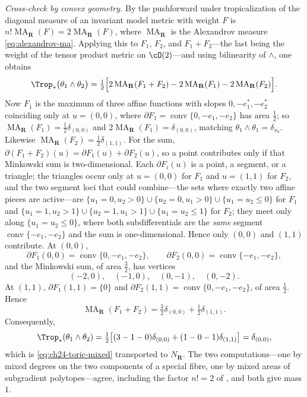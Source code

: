 \begin{example}
\emph{Cross-check by convex geometry.}  By
 the pushforward under tropicalization of the
diagonal measure of an invariant model metric with weight \(F\) is
\(n!\operatorname{MA}_{\mathbf R}(F)=2\operatorname{MA}_{\mathbf R}(F)\),
where \(\operatorname{MA}_{\mathbf R}\) is the Alexandrov measure
\eqref{eq:alexandrov-ma}.  Applying this to \(F_1\), \(F_2\), and
\(F_1+F_2\)---the last being the weight of the tensor product metric on
\(\cO(2)\)---and using bilinearity of \(\wedge\), one obtains
\[
 \Trop_*\bigl(\theta_1\wedge\theta_2\bigr)
 =\tfrac12\Bigl[
   2\operatorname{MA}_{\mathbf R}(F_1+F_2)
   -2\operatorname{MA}_{\mathbf R}(F_1)
   -2\operatorname{MA}_{\mathbf R}(F_2)\Bigr].
\]
Now \(F_1\) is the maximum of three affine functions with slopes
\(0,-e_1^*,-e_2^*\) coinciding only at \(u=(0,0)\), where
\(\partial F_1=\operatorname{conv}\{0,-e_1,-e_2\}\) has area \(\tfrac12\);
so \(\operatorname{MA}_{\mathbf R}(F_1)=\tfrac12\delta_{(0,0)}\) and
\(2\operatorname{MA}_{\mathbf R}(F_1)=\delta_{(0,0)}\), matching
\(\theta_1\wedge\theta_1=\delta_{x_0}\).  Likewise
\(\operatorname{MA}_{\mathbf R}(F_2)=\tfrac12\delta_{(1,1)}\).  For the sum,
\(\partial(F_1+F_2)(u)=\partial F_1(u)+\partial F_2(u)\), so a point
contributes only if that Minkowski sum is two-dimensional.  Each
\(\partial F_i(u)\) is a point, a segment, or a triangle; the triangles occur
only at \(u=(0,0)\) for \(F_1\) and \(u=(1,1)\) for \(F_2\), and the two
segment loci that could combine---the sets where exactly two affine pieces
are active---are \(\{u_1=0,u_2>0\}\cup\{u_2=0,u_1>0\}\cup\{u_1=u_2\leq0\}\)
for \(F_1\) and \(\{u_1=1,u_2>1\}\cup\{u_2=1,u_1>1\}
\cup\{u_1=u_2\leq1\}\) for \(F_2\); they meet only along
\(\{u_1=u_2\leq0\}\), where both subdifferentials are the \emph{same}
segment \(\operatorname{conv}\{-e_1,-e_2\}\) and the sum is one-dimensional.
Hence only \((0,0)\) and \((1,1)\) contribute.  At \((0,0)\),
\[
 \partial F_1(0,0)=\operatorname{conv}\{0,-e_1,-e_2\},
 \qquad
 \partial F_2(0,0)=\operatorname{conv}\{-e_1,-e_2\},
\]
and the Minkowski sum, of area \(\tfrac32\), has vertices
\[
 (-2,0),\quad(-1,0),\quad(0,-1),\quad(0,-2).
\]
At \((1,1)\),
\(\partial F_1(1,1)=\{0\}\) and
\(\partial F_2(1,1)=\operatorname{conv}\{0,-e_1,-e_2\}\), of area
\(\tfrac12\).  Hence
\[
 \operatorname{MA}_{\mathbf R}(F_1+F_2)
 =\tfrac32\delta_{(0,0)}+\tfrac12\delta_{(1,1)}.
\]
Consequently,
\[
 \Trop_*(\theta_1\wedge\theta_2)
 =\tfrac12\bigl[(3-1-0)\delta_{(0,0)}+(1-0-1)\delta_{(1,1)}\bigr]
 =\delta_{(0,0)},
\]
which is \eqref{eq:ch24-toric-mixed} transported to \(N_{\mathbf R}\).  The
two computations---one by mixed degrees on the two components of a special
fibre, one by mixed areas of subgradient polytopes---agree, including the
factor \(n!=2\) of , and both give mass
\(1\).


\end{example}
